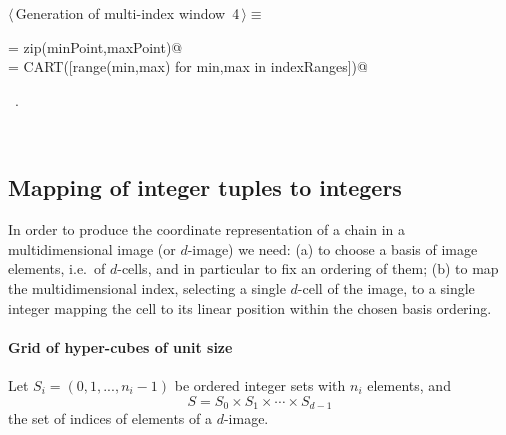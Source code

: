 \documentclass[11pt,oneside]{article}	%
\begin{document}
\begin{flushleft} \small
\begin{minipage}{\linewidth} \label{scrap5}
\protect{}$\langle\,$Generation of multi-index window\nobreak\ {\footnotesize 4}$\,\rangle\equiv$
\vspace{-1ex}
\begin{list}{}{} \item
\mbox{}\verb@indexRanges = zip(minPoint,maxPoint)@\\
\mbox{}\verb@tuples = CART([range(min,max) for min,max in indexRanges])@\\
\mbox{}\verb@@{\NWsep}
\end{list}
\vspace{-1ex}
\footnotesize\addtolength{\baselineskip}{-1ex}
\begin{list}{}{\setlength{\itemsep}{-\parsep}\setlength{\itemindent}{-\leftmargin}}
\item \NWtxtMacroRefIn\ .
\end{list}
\end{minipage}\\[4ex]
\end{flushleft}



\subsection{Mapping of integer tuples to integers}

In order to produce the coordinate representation of a chain in a multidimensional image (or $d$-image) we need: (a) to choose a basis of image elements, i.e.~of $d$-cells, and in particular to fix an ordering of them; (b) to map the multidimensional index, selecting a single $d$-cell of the image, to a single integer mapping the cell to its linear position within the chosen basis ordering. 


\paragraph{Grid of hyper-cubes of unit size}
Let $S_i=(0,1,...,n_i-1)$ be ordered integer sets with $n_i$ elements, and 
\[
S= S_0 \times S_1 \times \cdots \times S_{d-1}
\] 
the set of indices of elements of a $d$-image.
\end{document}
